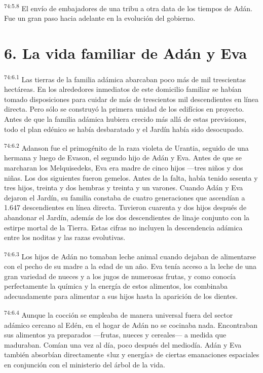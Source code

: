 \par
\textsuperscript{74:5.8} El envío de embajadores de una tribu a otra data de los tiempos de Adán. Fue un gran paso hacia adelante en la evolución del gobierno.

\section*{6. La vida familiar de Adán y Eva}
\par
\textsuperscript{74:6.1} Las tierras de la familia adámica abarcaban poco más de mil trescientas hectáreas. En los alrededores inmediatos de este domicilio familiar se habían tomado disposiciones para cuidar de más de trescientos mil descendientes en línea directa. Pero sólo se construyó la primera unidad de los edifícios en proyecto. Antes de que la familia adámica hubiera crecido más allá de estas previsiones, todo el plan edénico se había desbaratado y el Jardín había sido desocupado.

\par
\textsuperscript{74:6.2} Adanson fue el primogénito de la raza violeta de Urantia, seguido de una hermana y luego de Evason, el segundo hijo de Adán y Eva. Antes de que se marcharan los Melquisedeks, Eva era madre de cinco hijos ---tres niños y dos niñas. Los dos siguientes fueron gemelos. Antes de la falta, había tenido sesenta y tres hijos, treinta y dos hembras y treinta y un varones. Cuando Adán y Eva dejaron el Jardín, su familia constaba de cuatro generaciones que ascendían a 1.647 descendientes en línea directa. Tuvieron cuarenta y dos hijos después de abandonar el Jardín, además de los dos descendientes de linaje conjunto con la estirpe mortal de la Tierra. Estas cifras no incluyen la descendencia adámica entre los noditas y las razas evolutivas.

\par
\textsuperscript{74:6.3} Los hijos de Adán no tomaban leche animal cuando dejaban de alimentarse con el pecho de su madre a la edad de un año. Eva tenía acceso a la leche de una gran variedad de nueces y a los jugos de numerosas frutas, y como conocía perfectamente la química y la energía de estos alimentos, los combinaba adecuadamente para alimentar a sus hijos hasta la aparición de los dientes.

\par
\textsuperscript{74:6.4} Aunque la cocción se empleaba de manera universal fuera del sector adámico cercano al Edén, en el hogar de Adán no se cocinaba nada. Encontraban sus alimentos ya preparados ---frutas, nueces y cereales--- a medida que maduraban. Comían una vez al día, poco después del mediodía. Adán y Eva también absorbían directamente «luz y energía» de ciertas emanaciones espaciales en conjunción con el ministerio del árbol de la vida.

